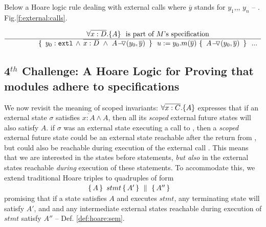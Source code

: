  {Below %
 a  Hoare logic rule %
dealing with external calls where $\overline y$ stands for $y_1$,,, $y_n$ -- \cf. Fig.\ref{f:external:calls}.}
 
 $\inferruleNoName  
 	{ 
   	   {\TwoStatesN {\overline {x:D}} {A}}\ \   \mbox{is part of $M$'s specification}
        }
	{   \triple { \    { \external{y_0}} \,     \wedge \,  \overline{x:D}\  \wedge\  {\PushASLong {(y_0,\overline y)}{A}} \ }  
						{ \ u:=y_0.m(\overline y)\    }
						{ \    {\PushASLong {(y_0,\overline y)}{A}}  \ }
						\  \  ...
         }
$

 
 
 
   \subsection{4$^{th}$ Challenge: A Hoare Logic for Proving that modules adhere to specifications} %

 We now revisit the meaning of scoped invariants: 
  {$\forall {\overline{x:C}}.{{\{}}{A}{{\}}}$} expresses that if an external {state} $\sigma$ 
 satisfies $\overline {x:A} \wedge A$, then all its \emph{scoped} external future  states will  {also} satisfy  {$A$}. 
\Eg if $\sigma$ was an external state executing a call to , then a \emph{scoped} external future  state
 could be an external state reachable 
after the return from , but could also be reachable
during execution of the external call .
This means that we are  interested in the states before %
statements, \emph{but  also}  in the external states reachable \emph{during} execution of these statements. 
To accommodate this, we extend   traditional Hoare triples to quadruples of  form\\
 $\strut \ \hspace{4cm} \quadruple {A} {\, stmt\, }{A'} {A''}$\\  
 promising that if a state satisfies $A$ and executes $stmt$, any terminating state will satisfy $A'$, and 
 and  any intermediate external states reachable during execution of $stmt$ satisfy    $A''$ -- \cf Def. \ref{def:hoare:sem}.

